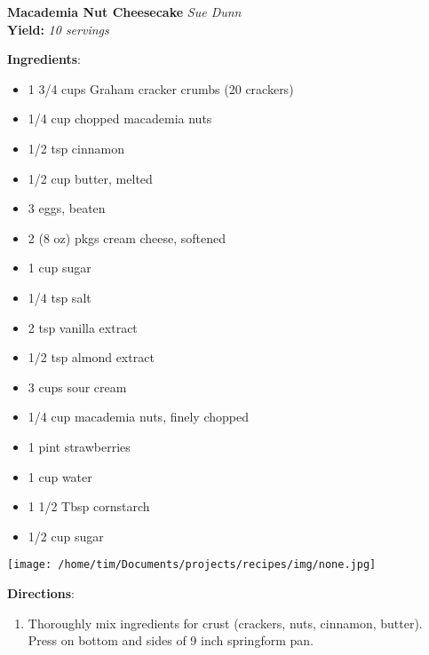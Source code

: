 \documentclass[11pt, twoside, openany]{book}
\begin{document}
\noindent\begin{minipage}[t]{\linewidth}%
{\Large\textbf{Macademia Nut Cheesecake}} \label{macademia-nut-cheesecake}\hfill\textit{Sue Dunn}\\
\textbf{Yield:} \textit{10 servings}\\
\noindent\begin{minipage}[t]{0.78\linewidth}%
\textbf{Ingredients}:\vspace{-3mm}
\begin{multicols}{2}
\begin{itemize}\setlength\itemsep{-1mm}
\item 1 3/4 cups Graham cracker crumbs (20 crackers)
\item 1/4 cup chopped macademia nuts
\item 1/2 tsp cinnamon
\item 1/2 cup butter, melted
\item 3 eggs, beaten
\item 2 (8 oz) pkgs cream cheese, softened
\item 1 cup sugar
\item 1/4 tsp salt
\item 2 tsp vanilla extract
\item 1/2 tsp almond extract
\item 3 cups sour cream
\item 1/4 cup macademia nuts, finely chopped
\item 1 pint strawberries
\item 1 cup water
\item 1 1/2 Tbsp cornstarch
\item 1/2 cup sugar
\end{itemize}
\end{multicols}
\end{minipage}
\noindent\begin{minipage}[t]{0.18\linewidth}
\centering \strut\vspace*{-\baselineskip}\newline
\texttt{[image: /home/tim/Documents/projects/recipes/img/none.jpg]}\\
\end{minipage}\vspace{3mm}
\textbf{Directions}:
\vspace{-3mm}\begin{enumerate}\setlength\itemsep{-1mm}
\item Thoroughly mix ingredients for crust (crackers, nuts, cinnamon, butter). Press on bottom and sides of 9 inch springform pan.

\end{enumerate}
\end{minipage}
\end{document}
